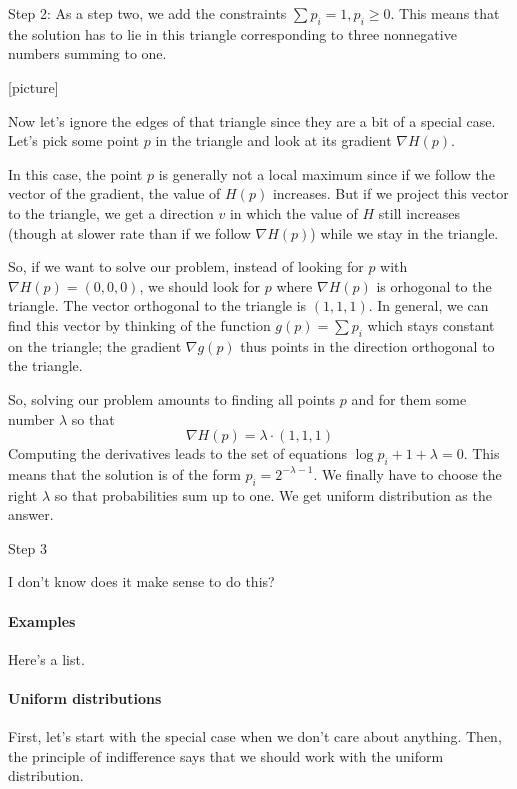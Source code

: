 \documentclass{article}
\begin{document}
Step 2:
As a step two, we add the constraints $\sum p_i = 1, p_i \ge 0$. This means that the solution has to lie in this triangle corresponding to three nonnegative numbers summing to one. 

[picture]

Now let's ignore the edges of that triangle since they are a bit of a special case. Let's pick some point $p$ in the triangle and look at its gradient $\nabla H(p)$. 

In this case, the point $p$ is generally not a local maximum since if we follow the vector of the gradient, the value of $H(p)$ increases. But if we project this vector to the triangle, we get a direction $v$ in which the value of $H$ still increases (though at slower rate than if we follow $\nabla H(p)$) while we stay in the triangle. 

So, if we want to solve our problem, instead of looking for $p$ with $\nabla H(p) = (0,0,0)$, we should look for $p$ where $\nabla H(p)$ is orhogonal to the triangle. The vector orthogonal to the triangle is $(1,1,1)$. 
In general, we can find this vector by thinking of the function $g(p) = \sum p_i$ which stays constant on the triangle; the gradient $\nabla g(p)$ thus points in the direction orthogonal to the triangle. 

So, solving our problem amounts to finding all points $p$ and for them some number $\lambda$ so that
\[
\nabla H(p) = \lambda \cdot (1,1,1)
\]
Computing the derivatives leads to the set of equations
$\log p_i + 1 + \lambda = 0$. This means that the solution is of the form $p_i = 2^{-\lambda -1}$. We finally have to choose the right $\lambda$ so that probabilities sum up to one. We get uniform distribution as the answer. 


Step 3

I don't know does it make sense to do this?

\paragraph{Examples}

Here's a list. 


\paragraph{Uniform distributions}

First, let's start with the special case when we don't care about anything. Then, the principle of indifference says that we should work with the uniform distribution. 
\end{document}
